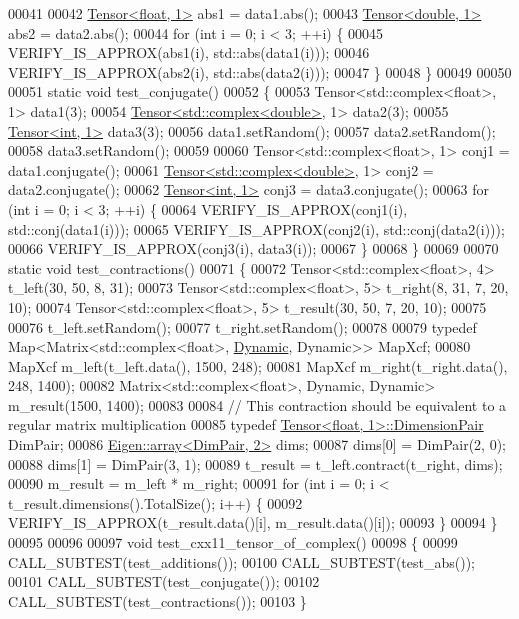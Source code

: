 \begin{DoxyCode}
00041 
00042   \hyperlink{class_eigen_1_1_tensor}{Tensor<float, 1>} abs1 = data1.abs();
00043   \hyperlink{class_eigen_1_1_tensor}{Tensor<double, 1>} abs2 = data2.abs();
00044   \textcolor{keywordflow}{for} (\textcolor{keywordtype}{int} i = 0; i < 3; ++i) \{
00045     VERIFY\_IS\_APPROX(abs1(i), std::abs(data1(i)));
00046     VERIFY\_IS\_APPROX(abs2(i), std::abs(data2(i)));
00047   \}
00048 \}
00049 
00050 
00051 \textcolor{keyword}{static} \textcolor{keywordtype}{void} test\_conjugate()
00052 \{
00053   Tensor<std::complex<float>, 1> data1(3);
00054   \hyperlink{class_eigen_1_1_tensor}{Tensor<std::complex<double>}, 1> data2(3);
00055   \hyperlink{class_eigen_1_1_tensor}{Tensor<int, 1>} data3(3);
00056   data1.setRandom();
00057   data2.setRandom();
00058   data3.setRandom();
00059 
00060   Tensor<std::complex<float>, 1> conj1 = data1.conjugate();
00061   \hyperlink{class_eigen_1_1_tensor}{Tensor<std::complex<double>}, 1> conj2 = data2.conjugate();
00062   \hyperlink{class_eigen_1_1_tensor}{Tensor<int, 1>} conj3 = data3.conjugate();
00063   \textcolor{keywordflow}{for} (\textcolor{keywordtype}{int} i = 0; i < 3; ++i) \{
00064     VERIFY\_IS\_APPROX(conj1(i), std::conj(data1(i)));
00065     VERIFY\_IS\_APPROX(conj2(i), std::conj(data2(i)));
00066     VERIFY\_IS\_APPROX(conj3(i), data3(i));
00067   \}
00068 \}
00069 
00070 \textcolor{keyword}{static} \textcolor{keywordtype}{void} test\_contractions()
00071 \{
00072   Tensor<std::complex<float>, 4> t\_left(30, 50, 8, 31);
00073   Tensor<std::complex<float>, 5> t\_right(8, 31, 7, 20, 10);
00074   Tensor<std::complex<float>, 5> t\_result(30, 50, 7, 20, 10);
00075 
00076   t\_left.setRandom();
00077   t\_right.setRandom();
00078 
00079   \textcolor{keyword}{typedef} Map<Matrix<std::complex<float>, \hyperlink{namespace_eigen_ad81fa7195215a0ce30017dfac309f0b2}{Dynamic}, Dynamic>> MapXcf;
00080   MapXcf m\_left(t\_left.data(), 1500, 248);
00081   MapXcf m\_right(t\_right.data(), 248, 1400);
00082   Matrix<std::complex<float>, Dynamic, Dynamic> m\_result(1500, 1400);
00083 
00084   \textcolor{comment}{// This contraction should be equivalent to a regular matrix multiplication}
00085   \textcolor{keyword}{typedef} \hyperlink{class_eigen_1_1_tensor}{Tensor<float, 1>::DimensionPair} DimPair;
00086   \hyperlink{class_eigen_1_1array}{Eigen::array<DimPair, 2>} dims;
00087   dims[0] = DimPair(2, 0);
00088   dims[1] = DimPair(3, 1);
00089   t\_result = t\_left.contract(t\_right, dims);
00090   m\_result = m\_left * m\_right;
00091   \textcolor{keywordflow}{for} (\textcolor{keywordtype}{int} i = 0; i < t\_result.dimensions().TotalSize(); i++) \{
00092     VERIFY\_IS\_APPROX(t\_result.data()[i], m\_result.data()[i]);
00093   \}
00094 \}
00095 
00096 
00097 \textcolor{keywordtype}{void} test\_cxx11\_tensor\_of\_complex()
00098 \{
00099   CALL\_SUBTEST(test\_additions());
00100   CALL\_SUBTEST(test\_abs());
00101   CALL\_SUBTEST(test\_conjugate());
00102   CALL\_SUBTEST(test\_contractions());
00103 \}
\end{DoxyCode}
